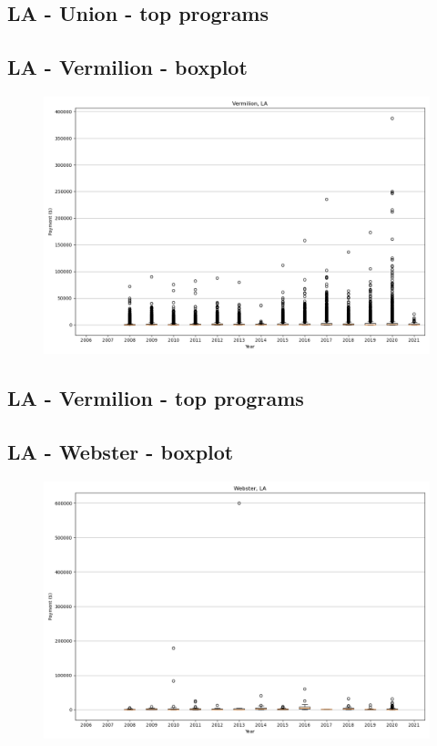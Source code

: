 \subsection*{LA - Union - top programs}

\newpage
\subsection*{LA - Vermilion - boxplot}
\begin{figure}[h]
\centering
\includegraphics[width=7in]{../output/boxplots/counties/Vermilion-LA_boxplot.png}
\end{figure}


\subsection*{LA - Vermilion - top programs}

\newpage
\subsection*{LA - Webster - boxplot}
\begin{figure}[h]
\centering
\includegraphics[width=7in]{../output/boxplots/counties/Webster-LA_boxplot.png}
\end{figure}


